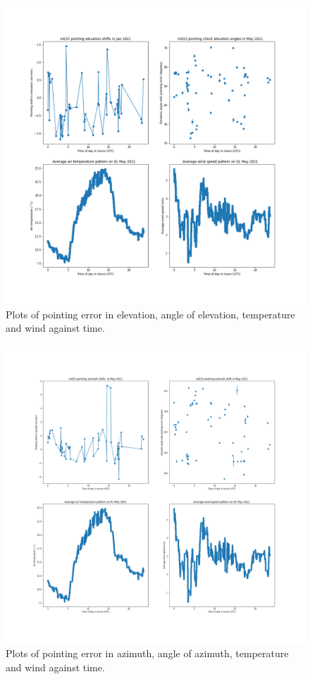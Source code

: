 \documentclass{article}
\begin{document}
\begin{figure}[H]
	\centering
	\includegraphics[scale=0.35]{m033_elev_May.png}
	
	\caption{Plots of pointing error in elevation, angle of elevation, temperature and wind against time.}
	\label{fig:m033ElevMay}
\end{figure}

\begin{figure}[H]
	\centering
	\includegraphics[scale=0.35]{m033_azim_May.png}
	
	\caption{Plots of pointing error in azimuth, angle of azimuth, temperature and wind against time.}
	\label{fig:m033AzimMay}
\end{figure}
\end{document}
